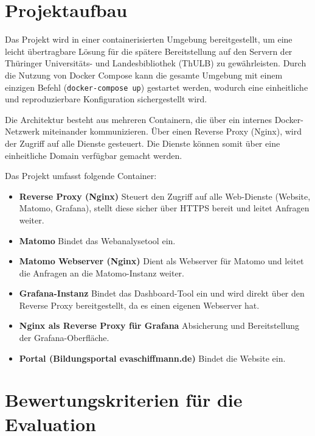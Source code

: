 \section{Projektaufbau}
\label{sec:projektaufbau}
Das Projekt wird in einer containerisierten Umgebung bereitgestellt, um eine leicht übertragbare Lösung für die spätere Bereitstellung auf den Servern der Thüringer Universitäts- und Landesbibliothek (ThULB) zu gewährleisten. Durch die Nutzung von Docker Compose kann die gesamte Umgebung mit einem einzigen Befehl (\texttt{docker-compose up}) gestartet werden, wodurch eine einheitliche und reproduzierbare Konfiguration sichergestellt wird.

Die Architektur besteht aus mehreren Containern, die über ein internes Docker-Netzwerk miteinander kommunizieren. Über einen Reverse Proxy (Nginx), wird der Zugriff auf alle Dienste gesteuert. Die Dienste können somit über eine einheitliche Domain verfügbar gemacht werden.

Das Projekt umfasst folgende Container:

\begin{itemize}
    \item \textbf{Reverse Proxy (Nginx)}  
    Steuert den Zugriff auf alle Web-Dienste (Website, Matomo, Grafana), stellt diese sicher über HTTPS bereit und leitet Anfragen weiter.

    \item \textbf{Matomo}  
    Bindet das Webanalysetool ein.

    \item \textbf{Matomo Webserver (Nginx)}  
    Dient als Webserver für Matomo und leitet die Anfragen an die Matomo-Instanz weiter.

    \item \textbf{Grafana-Instanz}  
    Bindet das Dashboard-Tool ein und wird direkt über den Reverse Proxy bereitgestellt, da es einen eigenen Webserver hat.

    \item \textbf{Nginx als Reverse Proxy für Grafana}  
    Absicherung und Bereitstellung der Grafana-Oberfläche.

    \item \textbf{Portal (Bildungsportal evaschiffmann.de)}  
    Bindet die Website ein.
\end{itemize}


\section{Bewertungskriterien für die Evaluation}
\label{sec:bewertungskriterien}
